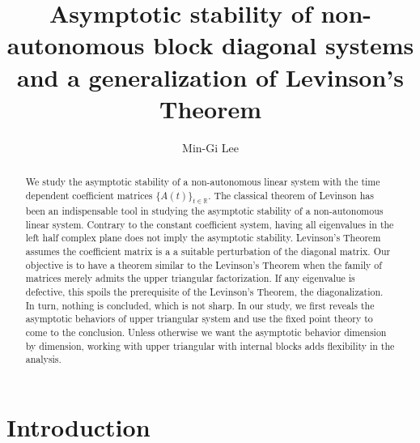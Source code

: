 \documentclass[a4paper,11pt]{article}
\newcounter{Theorem}
\theoremstyle{remark}
\begin{document}
\title{Asymptotic stability of non-autonomous block diagonal systems and a generalization of Levinson's Theorem}
\author{Min-Gi Lee\footnotemark[1]}
\date{}

\maketitle
\renewcommand{\thefootnote}{\fnsymbol{footnote}}
\renewcommand{\thefootnote}{\arabic{footnote}}

 \begin{abstract}
We study the asymptotic stability of a non-autonomous linear system with the time dependent coefficient matrices $\{A(t)\}_{t\in \mathbb{R}}$. The classical theorem of Levinson has been an  indispensable tool in studying the asymptotic stability of a non-autonomous linear system. Contrary to the constant coefficient system, having all eigenvalues in the left half complex plane does not imply the asymptotic stability. Levinson's Theorem assumes the coefficient matrix is a  a suitable perturbation of the diagonal matrix. Our objective is to have a theorem similar to the Levinson's Theorem when the family of matrices merely admits the upper triangular factorization. If any eigenvalue is defective, this spoils the prerequisite of the Levinson's Theorem, the diagonalization. In turn, nothing is concluded, which is not sharp. In our study, we first reveals the asymptotic behaviors of upper triangular system and use the fixed point theory to come to the conclusion. Unless otherwise we want the asymptotic behavior dimension by dimension, working with upper triangular with internal blocks adds flexibility in the analysis.
 \end{abstract}



\vfil\eject


\section{Introduction}
\end{document}
